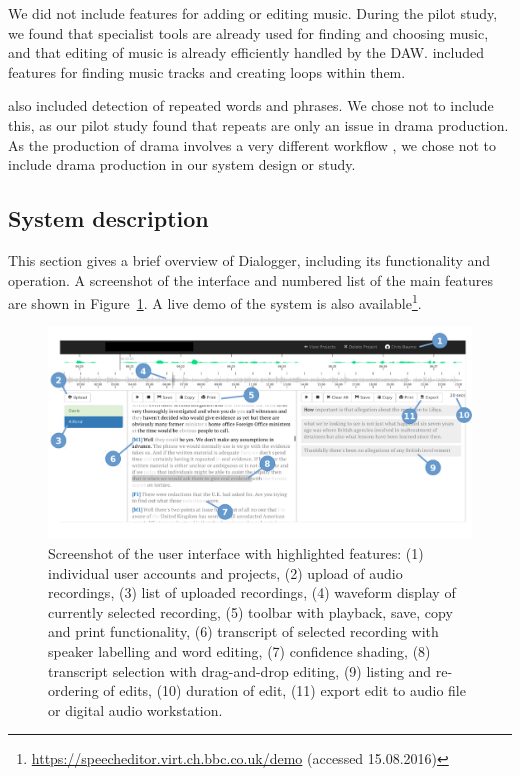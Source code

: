 We did not include features for adding or editing music. During the pilot study, we found that specialist tools are
already used for finding and choosing music, and that editing of music is already efficiently handled by the DAW.
\citet{Rubin2013} included features for finding music tracks and creating loops within them.

\citet{Rubin2013} also included detection of repeated words and phrases. We chose not to include this, as our pilot
study found that repeats are only an issue in drama production. As the production of drama involves a very different
workflow \citep{Baume2015}, we chose not to include drama production in our system design or study.


\subsection{System description}
This section gives a brief overview of Dialogger, including its functionality and operation.  A screenshot of the
interface and numbered list of the main features are shown in Figure~\ref{fig:interface}.  A live demo of the system is
also available\footnote{\url{https://speecheditor.virt.ch.bbc.co.uk/demo} (accessed 15.08.2016)}.

\begin{figure}[ht]
\centering
  \includegraphics[width=\columnwidth]{figs/interface-labels.pdf}
  \caption{Screenshot of the user interface with highlighted features: (1)
    individual user accounts and projects, (2) upload of audio recordings, (3)
    list of uploaded recordings, (4) waveform display of currently selected
    recording, (5) toolbar with playback, save, copy and print functionality,
    (6) transcript of selected recording with speaker labelling and word
    editing, (7) confidence shading, (8) transcript selection with
    drag-and-drop editing, (9) listing and re-ordering of edits, (10) duration
    of edit, (11) export edit to audio file or digital audio workstation.}
  \label{fig:interface}
\end{figure}

